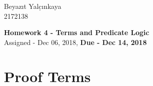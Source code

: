 \documentclass[11pt,a4paper]{article}
\begin{document}
\parbox[b]{3in}{
  \begin{flushleft} 
    Beyaz\i t Yal\d{c}\i nkaya \\ 2172138
  \end{flushleft} 
}


\begin{center}
\begin{Large}
{\bf Homework 4 - Terms and Predicate Logic } \\ \vspace{2mm} 
{\large Assigned - Dec 06, 2018, \;\;\; {\bf Due - Dec 14, 2018}}
\end{Large}
\end{center}

\section{Proof Terms}
\end{document}
